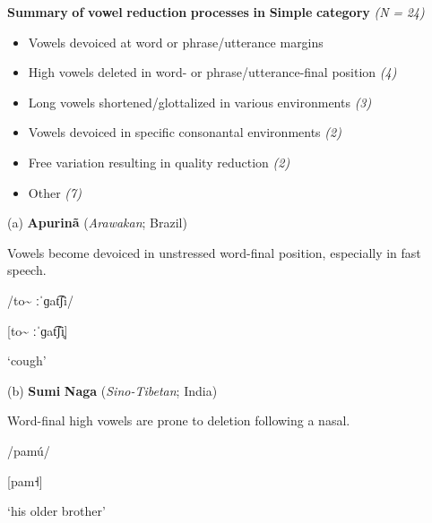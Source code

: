 \ea\label{ex:(6.16)}
  \textbf{Summary} \textbf{of} \textbf{vowel} \textbf{reduction} \textbf{processes} \textbf{in} \textbf{Simple} \textbf{category} \textit{(N} \textit{=} \textit{24)}


\begin{itemize}
\item 
Vowels devoiced at word or phrase/utterance margins \textit{}

\item 
High vowels deleted in word- or phrase/utterance-final position \textit{(4)}

\item 
Long vowels shortened/glottalized in various environments \textit{(3)}

\item 
Vowels devoiced in specific consonantal environments \textit{(2)}

\item 
Free variation resulting in quality reduction \textit{(2)}

\item 
Other \textit{(7)}

\end{itemize}

(a)   \textbf{Apurinã} (\textit{Arawakan}; Brazil)



Vowels become devoiced in unstressed word-final position, especially in fast speech.



/to\~{} ːˈɡat͡ʃi/



[to\~{} ːˈɡat͡ʃi̥]



‘cough’



\citep[60-1]{Facundes2000}



(b)   \textbf{Sumi} \textbf{Naga} (\textit{Sino-Tibetan}; India)



Word-final high vowels are prone to deletion following a nasal.



/pamú/



[pam˧]



‘his older brother’



\citep[369]{Teo2012}
\z



